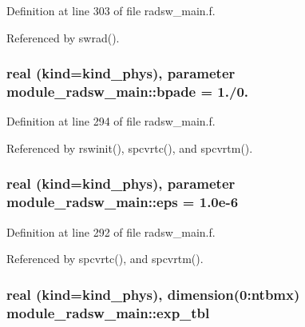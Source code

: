 Definition at line 303 of file radsw\+\_\+main.\+f.



Referenced by swrad().

\subsubsection[{\texorpdfstring{bpade}{bpade}}]{\setlength{\rightskip}{0pt plus 5cm}real (kind=kind\+\_\+phys), parameter module\+\_\+radsw\+\_\+main\+::bpade = 1./0.\hspace{0.3cm}{\ttfamily [private]}}\hypertarget{namespacemodule__radsw__main_acd9ae7c14cbfdc55f1f0fff637ca0331}{}\label{namespacemodule__radsw__main_acd9ae7c14cbfdc55f1f0fff637ca0331}


Definition at line 294 of file radsw\+\_\+main.\+f.



Referenced by rswinit(), spcvrtc(), and spcvrtm().

\subsubsection[{\texorpdfstring{eps}{eps}}]{\setlength{\rightskip}{0pt plus 5cm}real (kind=kind\+\_\+phys), parameter module\+\_\+radsw\+\_\+main\+::eps = 1.\+0e-\/6\hspace{0.3cm}{\ttfamily [private]}}\hypertarget{namespacemodule__radsw__main_a7d311ceb7f824ea31d31ba8144751b5a}{}\label{namespacemodule__radsw__main_a7d311ceb7f824ea31d31ba8144751b5a}


Definition at line 292 of file radsw\+\_\+main.\+f.



Referenced by spcvrtc(), and spcvrtm().

\subsubsection[{\texorpdfstring{exp\+\_\+tbl}{exp_tbl}}]{\setlength{\rightskip}{0pt plus 5cm}real (kind=kind\+\_\+phys), dimension(0\+:ntbmx) module\+\_\+radsw\+\_\+main\+::exp\+\_\+tbl\hspace{0.3cm}{\ttfamily [private]}}\hypertarget{namespacemodule__radsw__main_a1f9d18b17cc24321ed1cf45254ac2b0f}{}\label{namespacemodule__radsw__main_a1f9d18b17cc24321ed1cf45254ac2b0f}


